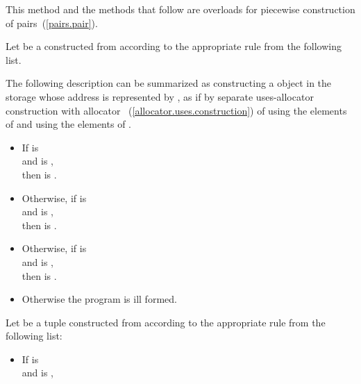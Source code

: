 \begin{itemdescr}
\pnum
\begin{note}
This method and the  methods that follow
are overloads for piecewise construction of pairs~(\ref{pairs.pair}).
\end{note}

\pnum
\effects
Let  be a  constructed from 
according to the appropriate rule from the following list.
\begin{note}
The following description can be summarized as
constructing a  object
in the storage whose address is represented by ,
as if by separate uses-allocator construction
with allocator ~(\ref{allocator.uses.construction})
of  using the elements of 
and  using the elements of .
\end{note}
\begin{itemize}
\item
If  is 
\\
and
 is ,
\\
then  is .
\item
Otherwise, if  is 
\\
and
 is ,
\\
then  is .
\item
Otherwise, if  is 
\\
and
 is ,
\\
then  is .
\item
Otherwise the program is ill formed.
\end{itemize}
Let  be a tuple constructed from 
according to the appropriate rule from the following list:
\begin{itemize}
\item
If  is 
\\
and
 is ,
\\

\end{itemize}
\end{itemdescr}
